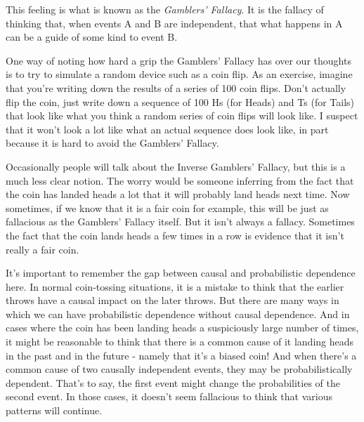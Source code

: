 This feeling is what is known as the \textit{Gamblers' Fallacy}. It is the fallacy of thinking that, when events A and B are independent, that what happens in A can be a guide of some kind to event B. 

One way of noting how hard a grip the Gamblers' Fallacy has over our thoughts is to try to simulate a random device such as a coin flip. As an exercise, imagine that you're writing down the results of a series of 100 coin flips. Don't actually flip the coin, just write down a sequence of 100 Hs (for Heads) and Ts (for Tails) that look like what you think a random series of coin flips will look like. I suspect that it won't look a lot like what an actual sequence does look like, in part because it is hard to avoid the Gamblers' Fallacy.

Occasionally people will talk about the Inverse Gamblers' Fallacy, but this is a much less clear notion. The worry would be someone inferring from the fact that the coin has landed heads a lot that it will probably land heads next time. Now sometimes, if we know that it is a fair coin for example, this will be just as fallacious as the Gamblers' Fallacy itself. But it isn't always a fallacy. Sometimes the fact that the coin lands heads a few times in a row is evidence that it isn't really a fair coin.

It's important to remember the gap between causal and probabilistic dependence here. In normal coin-tossing situations, it is a mistake to think that the earlier throws have a causal impact on the later throws. But there are many ways in which we can have probabilistic dependence without causal dependence. And in cases where the coin has been landing heads a suspiciously large number of times, it might be reasonable to think that there is a common cause of it landing heads in the past and in the future - namely that it's a biased coin! And when there's a common cause of two causally independent events, they may be probabilistically dependent. That's to say, the first event might change the probabilities of the second event. In those cases, it doesn't seem fallacious to think that various patterns will continue.

